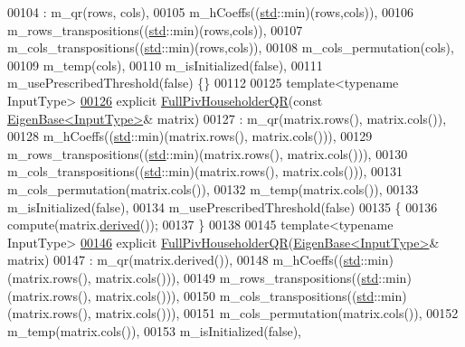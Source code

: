 \begin{DoxyCode}
00104       : m\_qr(rows, cols),
00105         m\_hCoeffs((\hyperlink{namespacestd}{std}::min)(rows,cols)),
00106         m\_rows\_transpositions((\hyperlink{namespacestd}{std}::min)(rows,cols)),
00107         m\_cols\_transpositions((\hyperlink{namespacestd}{std}::min)(rows,cols)),
00108         m\_cols\_permutation(cols),
00109         m\_temp(cols),
00110         m\_isInitialized(false),
00111         m\_usePrescribedThreshold(false) \{\}
00112 
00125     \textcolor{keyword}{template}<\textcolor{keyword}{typename} InputType>
\hyperlink{group___q_r___module_aeeace3abca6b215025e94c3e098b0a97}{00126}     \textcolor{keyword}{explicit} \hyperlink{group___q_r___module_aeeace3abca6b215025e94c3e098b0a97}{FullPivHouseholderQR}(\textcolor{keyword}{const} \hyperlink{group___core___module_struct_eigen_1_1_eigen_base}{EigenBase<InputType>}& 
      matrix)
00127       : m\_qr(matrix.rows(), matrix.cols()),
00128         m\_hCoeffs((\hyperlink{namespacestd}{std}::min)(matrix.rows(), matrix.cols())),
00129         m\_rows\_transpositions((\hyperlink{namespacestd}{std}::min)(matrix.rows(), matrix.cols())),
00130         m\_cols\_transpositions((\hyperlink{namespacestd}{std}::min)(matrix.rows(), matrix.cols())),
00131         m\_cols\_permutation(matrix.cols()),
00132         m\_temp(matrix.cols()),
00133         m\_isInitialized(false),
00134         m\_usePrescribedThreshold(false)
00135     \{
00136       compute(matrix.\hyperlink{group___core___module_a324b16961a11d2ecfd2d1b7dd7946545}{derived}());
00137     \}
00138 
00145     \textcolor{keyword}{template}<\textcolor{keyword}{typename} InputType>
\hyperlink{group___q_r___module_ac9bdb4f7fa77c1aa16f238592c248e70}{00146}     \textcolor{keyword}{explicit} \hyperlink{group___q_r___module_ac9bdb4f7fa77c1aa16f238592c248e70}{FullPivHouseholderQR}(\hyperlink{group___core___module_struct_eigen_1_1_eigen_base}{EigenBase<InputType>}& matrix)
00147       : m\_qr(matrix.derived()),
00148         m\_hCoeffs((\hyperlink{namespacestd}{std}::min)(matrix.rows(), matrix.cols())),
00149         m\_rows\_transpositions((\hyperlink{namespacestd}{std}::min)(matrix.rows(), matrix.cols())),
00150         m\_cols\_transpositions((\hyperlink{namespacestd}{std}::min)(matrix.rows(), matrix.cols())),
00151         m\_cols\_permutation(matrix.cols()),
00152         m\_temp(matrix.cols()),
00153         m\_isInitialized(false),

\end{DoxyCode}
